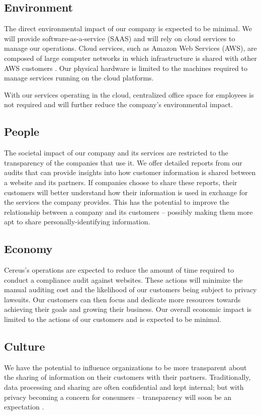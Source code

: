 \subsection{Environment}

The direct environmental impact of our company is expected to be minimal. We will provide software-as-a-service (SAAS) and will rely on cloud services to manage our operations. Cloud services, such as Amazon Web Services (AWS), are composed of large computer networks in which infrastructure is shared with other AWS customers \cite{aws.2020}. Our physical hardware is limited to the machines required to manage services running on the cloud platforms.

With our services operating in the cloud, centralized office space for employees is not required and will further reduce the company's environmental impact.

\subsection{People}

The societal impact of our company and its services are restricted to the transparency of the companies that use it. We offer detailed reports from our audits that can provide insights into how customer information is shared between a website and its partners. If companies choose to share these reports, their customers will better understand how their information is used in exchange for the services the company provides. This has the potential to improve the relationship between a company and its customers -- possibly making them more apt to share personally-identifying information.

\subsection{Economy}

Cereus's operations are expected to reduce the amount of time required to conduct a compliance audit against websites. These actions will minimize the manual auditing cost and the likelihood of our customers being subject to privacy lawsuits. Our customers can then focus and dedicate more resources towards achieving their goals and growing their business. Our overall economic impact is limited to the actions of our customers and is expected to be minimal.

\subsection{Culture}

We have the potential to influence organizations to be more transparent about the sharing of information on their customers with their partners. Traditionally, data processing and sharing are often confidential and kept internal; but with privacy becoming a concern for consumers -- transparency will soon be an expectation \cite{meehan.forbes.2019}.


